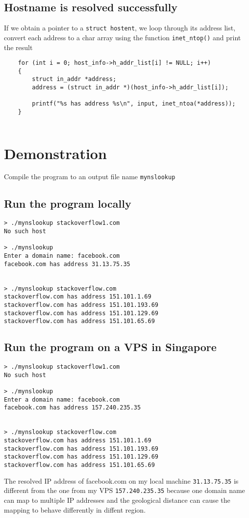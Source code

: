 \documentclass[12pt]{article}
\begin{document}
\subsection{Hostname is resolved successfully}
If we obtain a pointer to a \Verb"struct hostent", we loop through its address list, convert each address to a char array using the function \Verb"inet_ntop̣()" and print the result 
\begin{verbatim}
    for (int i = 0; host_info->h_addr_list[i] != NULL; i++)
    {
        struct in_addr *address;
        address = (struct in_addr *)(host_info->h_addr_list[i]);

        printf("%s has address %s\n", input, inet_ntoa(*address));
    }
    
\end{verbatim}


\clearpage
\section{Demonstration}
Compile the program to an output file name \Verb"mynslookup"
\subsection{Run the program locally}
\begin{verbatim}
> ./mynslookup stackoverflow1.com
No such host

> ./mynslookup
Enter a domain name: facebook.com
facebook.com has address 31.13.75.35


> ./mynslookup stackoverflow.com
stackoverflow.com has address 151.101.1.69
stackoverflow.com has address 151.101.193.69
stackoverflow.com has address 151.101.129.69
stackoverflow.com has address 151.101.65.69

\end{verbatim}
\subsection{Run the program on a VPS in Singapore}
\begin{verbatim}
> ./mynslookup stackoverflow1.com
No such host

> ./mynslookup
Enter a domain name: facebook.com
facebook.com has address 157.240.235.35


> ./mynslookup stackoverflow.com
stackoverflow.com has address 151.101.1.69
stackoverflow.com has address 151.101.193.69
stackoverflow.com has address 151.101.129.69
stackoverflow.com has address 151.101.65.69

\end{verbatim}
The resolved IP address of facebook.com on my local machine \Verb"31.13.75.35" is different from the one from my VPS \Verb"157.240.235.35" because one domain name can map to multiple IP addresses and the geological distance can cause the mapping to behave differently in diffent region.
\clearpage
\end{document}
